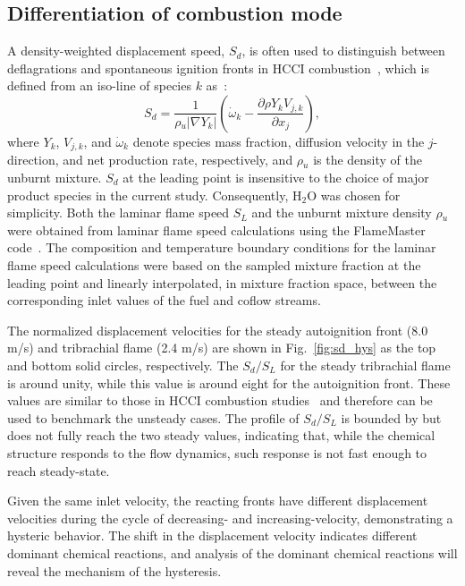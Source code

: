 \documentclass{essci}
\def\pp#1#2{\frac{\partial #1}{\partial #2}}
\begin{document}
\subsection{Differentiation of combustion mode}

A density-weighted displacement speed, $S_d$, is often used to distinguish between deflagrations and spontaneous ignition fronts in HCCI combustion~\cite{yoo13}, which is defined from an iso-line of species $k$ as~\cite{ruetsch95,im99}:
\begin{equation*}
S_d = \frac{1}{\rho{_u} |\nabla Y_k|} \left(\dot{\omega}{_k} - \pp{\rho Y_k V_{j,k}}{x_j} \right),
\end{equation*}
where $Y_k$, $V_{j,k}$, and $\dot{\omega}{_k}$ denote species mass fraction, diffusion velocity in the $j$-direction, and net production rate, respectively, and $\rho {_u}$ is the density of the unburnt mixture.  $S_d$ at the leading point is insensitive to the choice of major product species in the current study.  Consequently, H$_2$O was chosen for simplicity.  Both the laminar flame speed $S_L$ and the unburnt mixture density $\rho {_u}$ were obtained from laminar flame speed calculations using the FlameMaster code~\cite{flamemaster}.  The composition and temperature boundary conditions for the laminar flame speed calculations were based on the sampled mixture fraction at the leading point and linearly interpolated, in mixture fraction space, between the corresponding inlet values of the fuel and coflow streams.

The normalized displacement velocities for the steady autoignition front (8.0 m/s) and tribrachial flame (2.4 m/s) are shown in Fig.~\ref{fig:sd_hys} as the top and bottom solid circles, respectively.  The $S_d/S_L$ for the steady tribrachial flame is around unity, while this value is around eight for the autoignition front.  These values are similar to those in HCCI combustion studies~\cite{yoo13} and therefore can be used to benchmark the unsteady cases.  The profile of $S_d/S_L$ is bounded by but does not fully reach the two steady values, indicating that, while the chemical structure responds to the flow dynamics, such response is not fast enough to reach steady-state.

Given the same inlet velocity, the reacting fronts have different displacement velocities during the cycle of decreasing- and increasing-velocity, demonstrating a hysteric behavior.  The shift in the displacement velocity indicates different dominant chemical reactions, and analysis of the dominant chemical reactions will reveal the mechanism of the hysteresis.
\end{document}
